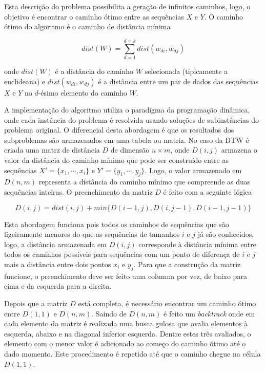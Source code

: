 Esta descrição do problema possibilita a geração de infinitos caminhos, logo, o objetivo é encontrar o caminho ótimo entre as sequências $X$ e $Y$. O caminho ótimo do algoritmo é o caminho de distância mínima

\begin{equation*}
    dist(W) = \sum_{d=1}^{d=k} dist(w_{di}, w_{dj})
\end{equation*}

onde $dist(W)$ é a distância do caminho $W$ selecionada (tipicamente a euclideana) e $dist(w_{di}, w_{dj})$ é a distância entre um par de dados das sequências $X$ e $Y$ no $d$-ésimo elemento do caminho $W$.

A implementação do algoritmo utiliza o paradigma da programação dinâmica, onde cada instância do problema é resolvida usando soluções de subinstâncias do problema original. O diferencial desta abordagem é que os resultados dos subproblemas são armazenados em uma tabela ou matriz. No caso da DTW é criada uma matrz de distância $D$ de dimensão $n \times m$, onde $D(i, j)$ armazena o valor da distância do caminho mínimo que pode ser construído entre as sequências $X' = \{x_1, \cdots, x_i\}$ e $Y' = \{y_1, \cdots, y_j\}$. Logo, o valor armazenado em $D(n, m)$ representa a distância do caminho mínimo que compreende as duas sequências inteiras. O preenchimento da matriz $D$ é feito com a seguinte lógica

\begin{equation*}
    D(i, j) = dist(i, j) + min\{D(i - 1, j), D(i, j - 1), D(i - 1, j - 1)\}
\end{equation*}

Esta abordagem funciona pois todos os caminhos de sequências que são ligeiramente menores do que as sequências de tamanhos $i$ e $j$ já são conhecidos, logo, a distância armazenada em $D(i, j)$ corresponde à distância mínima entre todos os caminhos possíveis para sequências com um ponto de diferença de $i$ e $j$ mais a distância entre dois pontos $x_i$ e $y_j$. Para que a construção da matriz funcione, o preenchimento deve ser feito uma columna por vez, de baixo para cima e da esquerda para a direita. 

Depois que a matriz $D$ está completa, é necessário encontrar um caminho ótimo entre $D(1, 1)$ e $D(n, m)$. Saindo de $D(n, m)$ é feito um \textit{backtrack} onde em cada elemento da matriz é realizada uma busca gulosa que avalia elementos à esquerda, abaixo e na diagonal inferior esquerda. Dentre estes três avaliados, o elemento com o menor valor é adicionado ao começo do caminho ótimo até o dado momento. Este procedimento é repetido até que o caminho chegue na célula $D(1, 1)$.

